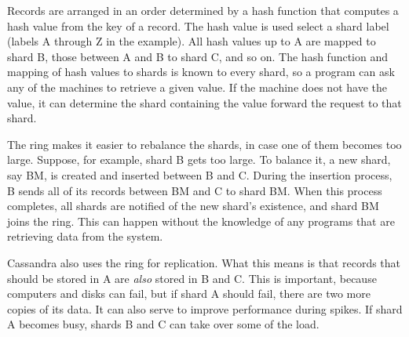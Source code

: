 Records are arranged in an order determined by a hash function
that computes a hash value from the key of a record.
The hash value is used select a shard label (labels A through Z in the example).
All hash values up to A are mapped to shard B,
those between A and B to shard C, and so on.
The hash function and mapping of hash values to shards is known to every shard,
so a program can ask any of the machines to retrieve a given value.
If the machine does not have the value,
it can determine the shard containing the value
forward the request to that shard.

The ring makes it easier to rebalance the shards,
in case one of them becomes too large.
Suppose, for example, shard B gets too large.
To balance it, a new shard, say BM, is created and inserted between B and C.
During the insertion process, B sends all of its records between BM and C to shard BM.
When this process completes, all shards are notified of the new
shard's existence, and shard BM joins the ring.
This can happen without the knowledge of any programs
that are retrieving data from the system.

Cassandra also uses the ring for replication.
What this means is that records that should be stored in A
are \emph{also} stored in B and C.
This is important, because computers and disks can fail,
but if shard A should fail, there are two more copies of its data.
It can also serve to improve performance during spikes.
If shard A becomes busy, shards B and C can take over some of the load.

